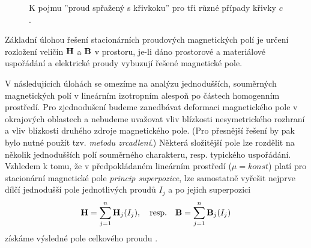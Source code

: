 {         \begin{figure}[hb!]
           \centering
           \caption[K pojmu ''proud spřažený s křivkoku'']{K pojmu ''proud spřažený s křivkoku''
                    pro tři různé případy křivky $c$.}
           \label{TEMP:fig_mag_sprazeny_proud123}
         \end{figure}
         
    Základní úlohou řešení stacionárních proudových magnetických polí je určení rozložení veličin 
    $\mathbf{H}$ a $\mathbf{B}$ v prostoru, je-li dáno prostorové a materiálové uspořádání a elektrické 
    proudy vybuzují řešené magnetické pole.
    
    V následujících úlohách se omezíme na analýzu jednodušších, souměrných magnetických polí v 
    lineárním izotropním alespoň po částech homogenním prostředí. Pro zjednodušení budeme 
    zanedbávat deformaci magnetického pole v okrajových oblastech a nebudeme uvažovat vliv 
    blízkosti nesymetrického rozhraní a vliv blízkosti druhého zdroje magnetického pole. (Pro 
    přesnější řešení by pak bylo nutné použít tzv. \emph{metodu zrcadlení}.) Některá složitější 
    pole lze rozdělit na několik jednodušších polí souměrného charakteru, resp. typického 
    uspořádání. Vzhledem k tomu, že v předpokládaném lineárním prostředí ($\mu 
    = konst$) platí pro stacionární magnetické pole \emph{princip superpozice}, lze samostatně 
    vyřešit nejprve dílčí jednodušší pole jednotlivých proudů $I_j$ a po jejich superpozici
      \begin{equation}\label{TEMP:eq_superp_mag_pole}
        \mathbf{H}= \sum_{j=1}^n\mathbf{H}_j(I_j), \quad\text{resp.}\quad \mathbf{B}= 
        \sum_{j=1}^n\mathbf{B}_j(I_j)   
      \end{equation}
    získáme výsledné pole celkového proudu \cite[s.~181]{Kotlan1999}. 
    
}

